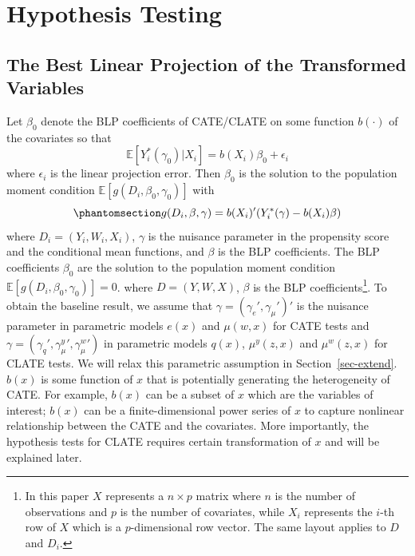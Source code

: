 \documentclass[
  12pt,
  12pt]{article}
\numberwithin{equation}{section}
\theoremstyle{definition}
\theoremstyle{plain}
\theoremstyle{plain}
\theoremstyle{remark}
\begin{document}
\section{Hypothesis Testing}\label{sec-method}

\subsection{The Best Linear Projection of the Transformed
Variables}\label{sec-proj}

Let \(\beta_0\) denote the BLP coefficients of CATE/CLATE on some
function \(b(\cdot)\) of the covariates so that \[
\mathbb{E}[Y_i^*(\gamma_0)|X_i] = b(X_i)\beta_0 + \epsilon_i
\] where \(\epsilon_i\) is the linear projection error. Then \(\beta_0\)
is the solution to the population moment condition
\(\mathbb{E}[g(D_i, \beta_0, \gamma_0)]\) with
\begin{equation}\phantomsection\label{eq-moment0}{
g(D_i, \beta, \gamma) = b(X_i)'(Y_i^*(\gamma) - b(X_i)\beta)
}\end{equation} where \(D_i = (Y_i, W_i, X_i)\), \(\gamma\) is the
nuisance parameter in the propensity score and the conditional mean
functions, and \(\beta\) is the BLP coefficients. The BLP coefficients
\(\beta_0\) are the solution to the population moment condition
\(\mathbb{E}[g(D_i, \beta_0, \gamma_0)] = 0\). where \(D = (Y, W, X)\),
\(\beta\) is the BLP coefficients\footnote{In this paper \(X\)
  represents a \(n \times p\) matrix where \(n\) is the number of
  observations and \(p\) is the number of covariates, while \(X_i\)
  represents the \(i\)-th row of \(X\) which is a \(p\)-dimensional row
  vector. The same layout applies to \(D\) and \(D_i\).}. To obtain the
baseline result, we assume that \(\gamma = (\gamma_e', \gamma_\mu')'\)
is the nuisance parameter in parametric models \(e(x)\) and
\(\mu(w, x)\) for CATE tests and
\(\gamma = (\gamma_q', {\gamma_\mu^y}', {\gamma_\mu^w}')\) in parametric
models \(q(x)\), \(\mu^y(z, x)\) and \(\mu^w(z, x)\) for CLATE tests. We
will relax this parametric assumption in Section~\ref{sec-extend}.
\(b(x)\) is some function of \(x\) that is potentially generating the
heterogeneity of CATE. For example, \(b(x)\) can be a subset of \(x\)
which are the variables of interest; \(b(x)\) can be a
finite-dimensional power series of \(x\) to capture nonlinear
relationship between the CATE and the covariates. More importantly, the
hypothesis tests for CLATE requires certain transformation of \(x\) and
will be explained later.
\end{document}
